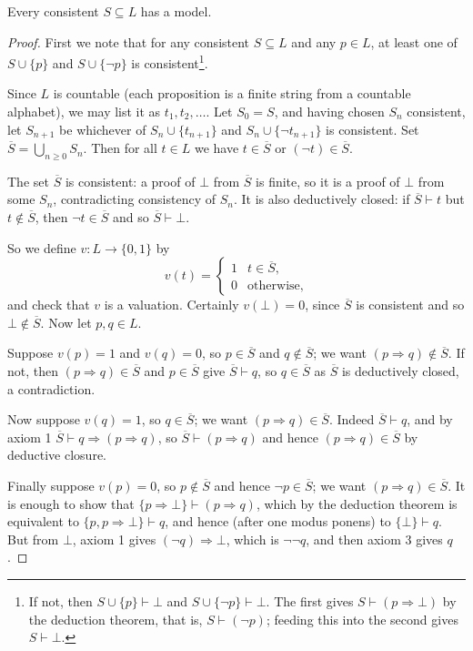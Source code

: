 \begin{theorem}\label{thm:propmodelexistence}
Every consistent $S \subseteq L$ has a model.
\end{theorem}
\begin{proof}
  First we note that for any consistent $S \subseteq L$ and any $p \in L$, at least one of $S \cup \{p\}$ and $S \cup \{\lnot p\}$ is consistent\footnote{If not, then $S \cup \{p\} \vdash \bot$ and $S \cup \{\lnot p\} \vdash \bot$. The first gives $S \vdash (p \Rightarrow \bot)$ by the deduction theorem, that is, $S \vdash (\lnot p)$; feeding this into the second gives $S \vdash \bot$.}.

  Since $L$ is countable (each proposition is a finite string from a countable alphabet), we may list it as $t_1, t_2, \dots$. Let $S_0 = S$, and having chosen $S_n$ consistent, let $S_{n+1}$ be whichever of $S_n \cup \{t_{n+1}\}$ and $S_n \cup \{\lnot t_{n+1}\}$ is consistent. Set $\overline{S} = \bigcup_{n \geq 0} S_n$. Then for all $t \in L$ we have $t \in \overline{S}$ or $(\lnot t) \in \overline{S}$.

  The set $\overline{S}$ is consistent: a proof of $\bot$ from $\overline S$ is finite, so it is a proof of $\bot$ from some $S_n$, contradicting consistency of $S_n$. It is also deductively closed: if $\overline S \vdash t$ but $t \notin \overline S$, then $\lnot t \in \overline S$ and so $\overline S \vdash \bot$.

  So we define $v: L \rightarrow \{0, 1\}$ by
  $$
  v(t) = \begin{cases}
        1 & t \in \overline{S},\\
        0 & \text{otherwise,}
       \end{cases}
  $$
  and check that $v$ is a valuation. Certainly $v(\bot) = 0$, since $\overline{S}$ is consistent and so $\bot \notin \overline{S}$. Now let $p, q \in L$.

  Suppose $v(p) = 1$ and $v(q) = 0$, so $p \in \overline S$ and $q \notin \overline S$; we want $(p \Rightarrow q) \notin \overline{S}$. If not, then $(p \Rightarrow q) \in \overline S$ and $p \in \overline S$ give $\overline S \vdash q$, so $q \in \overline S$ as $\overline S$ is deductively closed, a contradiction.

  Now suppose $v(q) = 1$, so $q \in \overline S$; we want $(p \Rightarrow q) \in \overline S$. Indeed $\overline{S} \vdash q$, and by axiom 1 $\overline{S} \vdash q \Rightarrow(p \Rightarrow q)$, so $\overline S \vdash (p \Rightarrow q)$ and hence $(p \Rightarrow q) \in \overline S$ by deductive closure.

  Finally suppose $v(p) = 0$, so $p \notin \overline S$ and hence $\lnot p \in \overline{S}$; we want $(p \Rightarrow q) \in \overline S$. It is enough to show that $\{p \Rightarrow \bot\} \vdash (p \Rightarrow q)$, which by the deduction theorem is equivalent to $\{p, p \Rightarrow \bot\} \vdash q$, and hence (after one modus ponens) to $\{\bot\} \vdash q$. But from $\bot$, axiom 1 gives $(\lnot q) \Rightarrow \bot$, which is $\lnot\lnot q$, and then axiom 3 gives $q$.
\end{proof}

